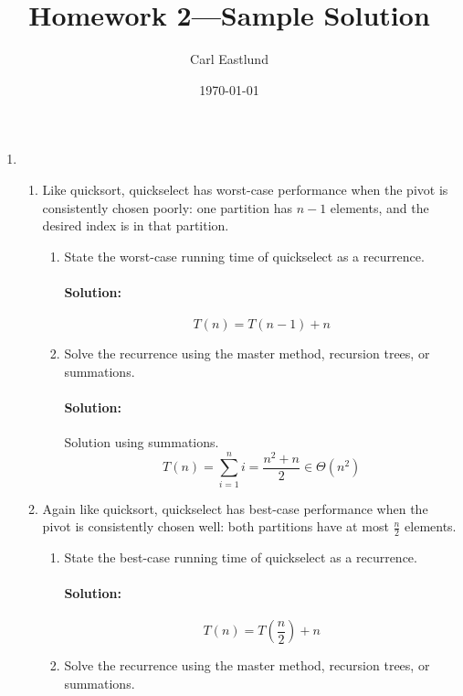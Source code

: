 \documentclass{article}
\title{Homework 2---Sample Solution}
\author{Carl Eastlund}
\date{\today}
\begin{document}
\maketitle

\begin{enumerate}

  \pagebreak[2]
\item
  \begin{enumerate}
    \addtocounter{enumii}{1}
  \item
    Like quicksort, quickselect has worst-case performance when the pivot is
    consistently chosen poorly: one partition has \(n-1\) elements, and the
    desired index is in that partition.
    \begin{enumerate}
    \item State the worst-case running time of quickselect as a recurrence.
      \paragraph{Solution:} \[T(n) = T(n-1) + n\]


    \item Solve the recurrence using the master method, recursion trees, or
      summations.
      \paragraph{Solution:} Solution using summations.
      \[T(n) = \sum_{i=1}^{n} i = \frac{n^2+n}{2} \in \Theta(n^2)\]


    \end{enumerate}
  \item
    Again like quicksort, quickselect has best-case performance when the pivot
    is consistently chosen well: both partitions have at most \(\frac{n}{2}\)
    elements.
    \begin{enumerate}
    \item State the best-case running time of quickselect as a recurrence.
      \paragraph{Solution:} \[T(n) = T(\frac{n}{2}) + n\]


    \item Solve the recurrence using the master method, recursion trees, or
      summations.

\end{enumerate}
\end{enumerate}
\end{enumerate}
\end{document}
